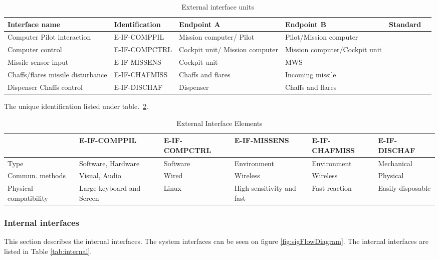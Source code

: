 \begin{center}
\begin{table}[h]
\caption{External interface units}
\label{tab:External}
\begin{tabular}{ | p{2cm} | l | p{2.3cm} | p{2.3cm} | l | p{1cm} |}
\hline
\textbf{Interface name} & \textbf{Identification} & \textbf{Endpoint A} & \textbf{Endpoint B} & \textbf{Standard}\\ \hline
Computer Pilot interaction & E-IF-COMPPIL & Mission computer/ Pilot & Pilot/Mission computer & \\ \hline
Computer control & E-IF-COMPCTRL & Cockpit unit/ Mission computer &Mission computer/Cockpit unit & \\ \hline
Missile sensor input & E-IF-MISSENS & Cockpit unit & MWS & \\ \hline
Chaffs/flares missile disturbance& E-IF-CHAFMISS & Chaffs and flares & Incoming missile & \\ \hline
Dispenser Chaffs control & E-IF-DISCHAF & Dispenser & Chaffs and flares & \\ \hline
\end{tabular}
\end{table}
\end{center}

 The unique identification listed under table.~\ref{tab:External2}. 
 \begin{table}[h]
 \caption{External Interface Elements}
 \label{tab:External2}
 \begin{tabular}{| p{1.5cm} | p{2.3cm} p{2cm} p{2.3cm} p{2.3cm} p{2.3cm} |}
 \hline
&E-IF-COMPPIL&E-IF-COMPCTRL&E-IF-MISSENS&E-IF-CHAFMISS&E-IF-DISCHAF\\
\hline
 Type&Software, Hardware&Software&Environment&Environment&Mechanical\\
 \hline
 Commun. methods&Visual, Audio&Wired&Wireless&Wireless&Physical\\
 \hline
 Physical compatibility&Large keyboard and Screen&Linux&High sensitivity and fast&Fast reaction&Easily disposable\\
 \hline
 \end{tabular}
 \end{table}

\clearpage
  \subsubsection{Internal interfaces}
This section describes the internal interfaces. The system interfaces can be seen on figure \ref{fig:sigFlowDiagram}. The internal interfaces are listed in Table \ref{tab:internal}.

